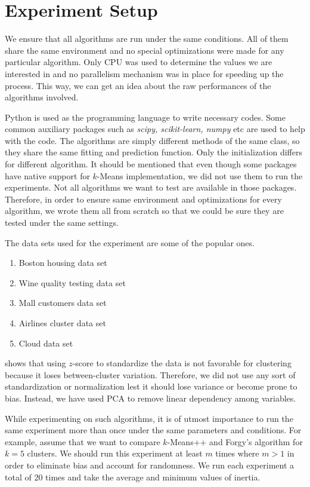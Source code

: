 \documentclass[twoside, 11pt]{article}
\begin{document}
	\section{Experiment Setup}
	We ensure that all algorithms are run under the same conditions. All of them share the same environment and no special optimizations were made for any particular algorithm. Only CPU was used to determine the values we are interested in and no parallelism mechanism was in place for speeding up the process. This way, we can get an idea about the raw performances of the algorithms involved.
	
	Python is used as the programming language to write necessary codes. Some common auxiliary packages such as \textit{scipy, scikit-learn, numpy} etc are used to help with the code. The algorithms are simply different methods of the same class, so they share the same fitting and prediction function. Only the initialization differs for different algorithm. It should be mentioned that even though some packages have native support for $k$-Means implementation, we did not use them to run the experiments. Not all algorithms we want to test are available in those packages. Therefore, in order to ensure same environment and optimizations for every algorithm, we wrote them all from scratch so that we could be sure they are tested under the same settings.
	
	The data sets used for the experiment are some of the popular ones.
		\begin{enumerate}
			\item Boston housing data set
			\item Wine quality testing data set
			\item Mall customers data set
			\item Airlines cluster data set
			\item Cloud data set
		\end{enumerate}
	\cite{miligan} shows that using $z$-score to standardize the data is not favorable for clustering because it loses between-cluster variation. Therefore, we did not use any sort of standardization or normalization lest it should lose variance or become prone to bias. Instead, we have used PCA to remove linear dependency among variables. 
	
	While experimenting on such algorithms, it is of utmost importance to run the same experiment more than once under the same parameters and conditions. For example, assume that we want to compare $k$-Means++ and Forgy's algorithm \citep{forgy} for $k=5$ clusters. We should run this experiment at least $m$ times where $m>1$ in order to eliminate bias and account for randomness. We run each experiment a total of $20$ times and take the average and minimum values of inertia.
	
\end{document}
